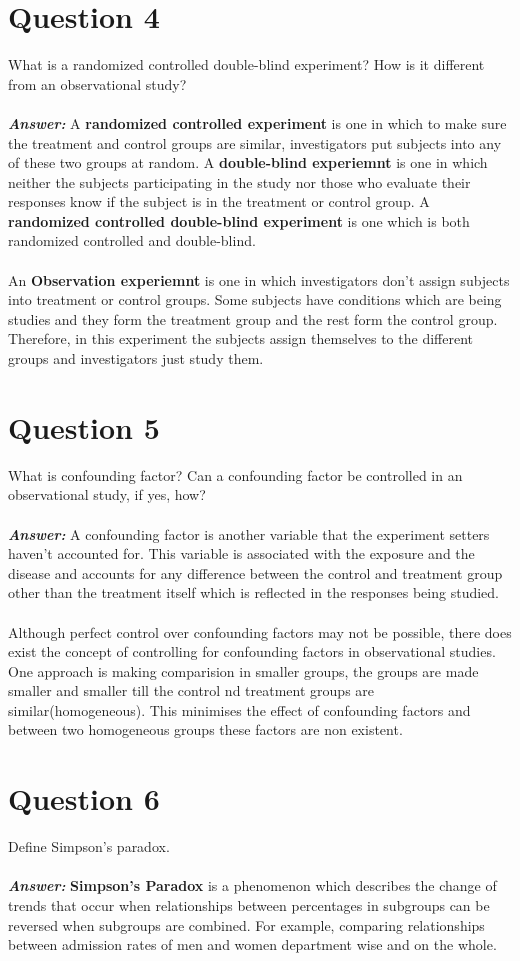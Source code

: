 \documentclass{article}
\begin{document}
\section{Question 4}
What is a randomized controlled double-blind experiment? How is it different from an observational study?
\\
\\
\textit{\textbf{Answer: }} A \textbf{randomized controlled experiment} is one in which to make sure the treatment and control groups are similar, investigators put subjects into any of these two groups at random. A \textbf{double-blind experiemnt} is one in which neither the subjects participating in the study nor those who evaluate their responses know if the subject is in the treatment or control group. A \textbf{randomized controlled double-blind experiment} is one which is both randomized controlled and double-blind.
\\\\
An \textbf{Observation experiemnt} is one in which investigators don't assign subjects into treatment or control groups. Some subjects have conditions which are being studies and they form the treatment group and the rest form the control group. Therefore, in this experiment the subjects assign themselves to the different groups and investigators just study them.

\section{Question 5}
What is confounding factor? Can a confounding factor be controlled in an observational study, if yes, how?
\\
\\
\textit{\textbf{Answer: }} A confounding factor is another variable that the experiment setters haven't accounted for. This variable is associated with the exposure and the disease and accounts for any difference between the control and treatment group other than the treatment itself which is reflected in the responses being studied. \\\\
Although perfect control over confounding factors may not be possible, there does exist the concept of controlling for confounding factors in observational studies. One approach is making comparision in smaller groups, the groups are made smaller and smaller till the control nd treatment groups are similar(homogeneous). This minimises the effect of confounding factors and between two homogeneous groups these factors are non existent.

\section{Question 6}
Define Simpson’s paradox.
\\
\\
\textit{\textbf{Answer: }} \textbf{Simpson's Paradox} is a phenomenon which describes the change of trends that occur when relationships between percentages in subgroups can be reversed when subgroups are combined. For example, comparing relationships between admission rates of men and women department wise and on the whole.
\end{document}
